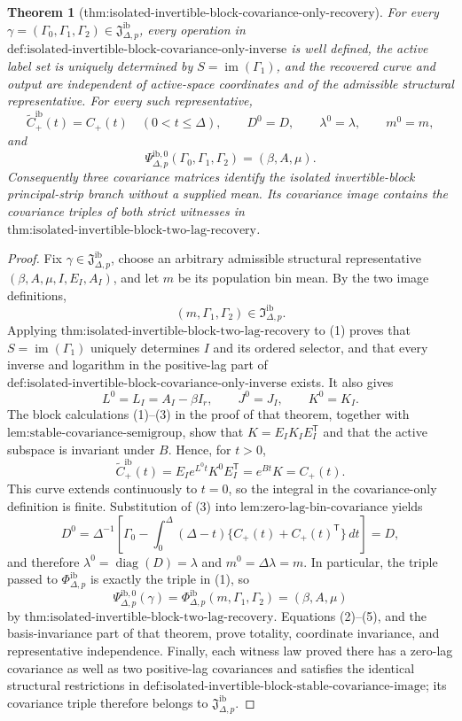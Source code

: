 \documentclass{article}
\newtheorem{theorem}{Theorem}
\begin{document}
\begin{theorem}[thm:isolated-invertible-block-covariance-only-recovery]\label{thm:isolated-invertible-block-covariance-only-recovery}
For every \(\gamma=(\Gamma_0,\Gamma_1,\Gamma_2)\in\mathfrak J_{\Delta,p}^{\mathrm{ib}}\), every operation in \(\text{def:isolated-invertible-block-covariance-only-inverse}\) is well defined, the active label set is uniquely determined by \(S=\operatorname{im}(\Gamma_1)\), and the recovered curve and output are independent of active-space coordinates and of the admissible structural representative.  For every such representative,
\[
 \widetilde C_{+}^{\mathrm{ib}}(t)=C_{+}(t)\quad(0<t\leq\Delta),\qquad
 D^0=D,\qquad \lambda^0=\lambda,\qquad m^0=m,
\]
and
\[
 \Psi_{\Delta,p}^{\mathrm{ib},0}(\Gamma_0,\Gamma_1,\Gamma_2)=(\beta,A,\mu).
\]
Consequently three covariance matrices identify the isolated invertible-block principal-strip branch without a supplied mean.  Its covariance image contains the covariance triples of both strict witnesses in \(\text{thm:isolated-invertible-block-two-lag-recovery}\).
\end{theorem}
\begin{proof}
Fix \(\gamma\in\mathfrak J_{\Delta,p}^{\mathrm{ib}}\), choose an arbitrary admissible structural representative \((\beta,A,\mu,I,E_I,A_I)\), and let \(m\) be its population bin mean.  By the two image definitions,
\[
 (m,\Gamma_1,\Gamma_2)\in\mathfrak I_{\Delta,p}^{\mathrm{ib}}.
\tag{1}
\]
Applying \(\text{thm:isolated-invertible-block-two-lag-recovery}\) to (1) proves that \(S=\operatorname{im}(\Gamma_1)\) uniquely determines \(I\) and its ordered selector, and that every inverse and logarithm in the positive-lag part of \(\text{def:isolated-invertible-block-covariance-only-inverse}\) exists.  It also gives
\[
 L^0=L_I=A_I-\beta I_r,\qquad J^0=J_I,\qquad K^0=K_I.
\tag{2}
\]
The block calculations (1)--(3) in the proof of that theorem, together with \(\text{lem:stable-covariance-semigroup}\), show that \(K=E_IK_IE_I^{\mathsf T}\) and that the active subspace is invariant under \(B\).  Hence, for \(t>0\),
\[
 \widetilde C_{+}^{\mathrm{ib}}(t)
 =E_Ie^{L^0t}K^0E_I^{\mathsf T}
 =e^{Bt}K=C_{+}(t).
\tag{3}
\]
This curve extends continuously to \(t=0\), so the integral in the covariance-only definition is finite.  Substitution of (3) into \(\text{lem:zero-lag-bin-covariance}\) yields
\[
 D^0=\Delta^{-1}\!\left[\Gamma_0-
 \int_0^\Delta(\Delta-t)\{C_{+}(t)+C_{+}(t)^{\mathsf T}\}\,dt\right]
 =D,
\tag{4}
\]
and therefore \(\lambda^0=\operatorname{diag}(D)=\lambda\) and \(m^0=\Delta\lambda=m\).  In particular, the triple passed to \(\Phi_{\Delta,p}^{\mathrm{ib}}\) is exactly the triple in (1), so
\[
 \Psi_{\Delta,p}^{\mathrm{ib},0}(\gamma)
 =\Phi_{\Delta,p}^{\mathrm{ib}}(m,\Gamma_1,\Gamma_2)
 =(\beta,A,\mu)
\tag{5}
\]
by \(\text{thm:isolated-invertible-block-two-lag-recovery}\).  Equations (2)--(5), and the basis-invariance part of that theorem, prove totality, coordinate invariance, and representative independence.  Finally, each witness law proved there has a zero-lag covariance as well as two positive-lag covariances and satisfies the identical structural restrictions in \(\text{def:isolated-invertible-block-stable-covariance-image}\); its covariance triple therefore belongs to \(\mathfrak J_{\Delta,p}^{\mathrm{ib}}\).
\end{proof}
\end{document}
